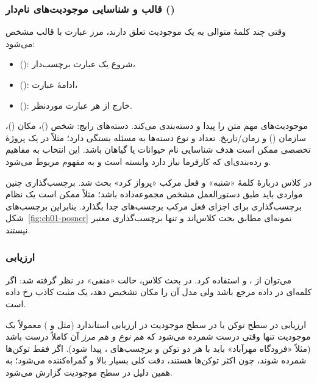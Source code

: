 \subsubsection{قالب  و شناسایی موجودیت‌های نام‌دار ()}
وقتی چند کلمهٔ متوالی به یک موجودیت تعلق دارند، مرز عبارت با قالب  مشخص می‌شود:
\begin{itemize}
  \item {} (): شروع یک عبارت برچسب‌دار،
  \item {} (): ادامهٔ عبارت،
  \item {} (): خارج از هر عبارت موردنظر.
\end{itemize}
 موجودیت‌های مهم متن را پیدا و دسته‌بندی می‌کند. دسته‌های رایج: شخص ()، مکان ()، سازمان () و زمان/تاریخ. تعداد و نوع دسته‌ها به مسئله بستگی دارد؛ مثلاً در یک پروژهٔ تخصصی ممکن است هدف شناسایی نام حیوانات یا گیاهان باشد. این انتخاب به مفاهیم و رده‌بندی‌ای که کارفرما نیاز دارد وابسته است و به مفهوم  مربوط می‌شود.

در کلاس دربارهٔ کلمهٔ «شنبه» و فعل مرکب «پرواز کرد» بحث شد. برچسب‌گذاری چنین مواردی باید طبق دستورالعمل مشخص مجموعه‌داده باشد؛ مثلاً ممکن است یک نظام برچسب‌گذاری برای اجزای فعل مرکب برچسب‌های جدا بگذارد. بنابراین برچسب‌های شکل~\ref{fig:ch01-posner} نمونه‌ای مطابق بحث کلاس‌اند و تنها برچسب‌گذاری معتبر نیستند.

\subsubsection{ارزیابی }
می‌توان از ،  و  استفاده کرد. در بحث کلاس،  حالت «منفی» در نظر گرفته شد: اگر کلمه‌ای در داده مرجع  باشد ولی مدل آن را مکان تشخیص دهد، یک مثبت کاذب رخ داده است.

\begin{correctionbox}{ارزیابی در سطح توکن یا در سطح موجودیت}
در ارزیابی استاندارد  (مثل  و ) معمولاً یک موجودیت تنها وقتی درست شمرده می‌شود که \emph{هم نوع و هم مرز} آن کاملاً درست باشد (مثلاً «فرودگاه مهرآباد» باید با هر دو توکن و برچسب‌های ،  پیدا شود). اگر فقط توکن‌ها شمرده شوند، چون اکثر توکن‌ها  هستند، دقت کلی بسیار بالا و گمراه‌کننده می‌شود؛ به همین دلیل  در سطح موجودیت گزارش می‌شود.
\end{correctionbox}

